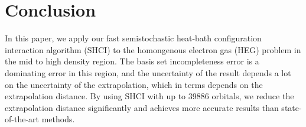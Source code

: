 \section{Conclusion}
In this paper, we apply our fast semistochastic heat-bath configuration interaction algorithm (SHCI) to the homongenous electron gas (HEG) problem in the mid to high density region.
The basis set incompleteness error is a dominating error in this region, and the uncertainty of the result depends a lot on the uncertainty of the extrapolation, which in terms depends on the extrapolation distance.
By using SHCI with up to 39886 orbitals, we reduce the extrapolation distance significantly and achieves more accurate results than state-of-the-art methods.

\label{conclusions}

